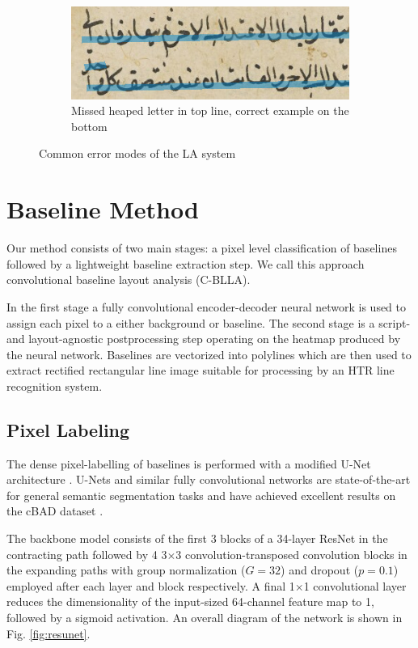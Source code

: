 \begin{figure}[ht!]
\begin{subfigure}[b]{\columnwidth}
		\includegraphics[width=\textwidth]{fail_heap.jpg}
		\caption{Missed heaped letter in top line, correct example on the bottom}
		\label{fig:misheap}
	\end{subfigure}
	\caption{Common error modes of the LA system}
\end{figure}

\section{Baseline Method}

Our method consists of two main stages: a pixel level classification of
baselines followed by a lightweight baseline extraction step. We call this
approach convolutional baseline layout analysis (C-BLLA).

In the first stage a fully convolutional encoder-decoder neural network is used
to assign each pixel to a either background or baseline. The second stage is a
script- and layout-agnostic postprocessing step operating on the heatmap
produced by the neural network. Baselines are vectorized into polylines which
are then used to extract rectified rectangular line image suitable for
processing by an HTR line recognition system.

\subsection{Pixel Labeling}

The dense pixel-labelling of baselines is performed with a modified U-Net
architecture \cite{ronneberger2015u}. U-Nets and similar fully convolutional
networks \cite{long2015fully} are state-of-the-art for general semantic
segmentation tasks and have achieved excellent results on the cBAD dataset
\cite{diem2017cbad}.

The backbone model consists of the first 3 blocks of a 34-layer ResNet in the
contracting path followed by 4 3$\times$3 convolution-transposed convolution
blocks in the expanding paths with group normalization
\cite{DBLP:journals/corr/abs-1803-08494} ($G = 32$) and dropout ($p = 0.1$)
employed after each layer and block respectively. A final 1$\times$1
convolutional layer reduces the dimensionality of the input-sized 64-channel
feature map to 1, followed by a sigmoid activation. An overall diagram of the
network is shown in Fig. \ref{fig:resunet}.


